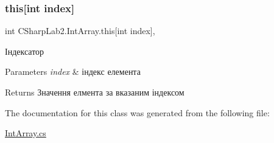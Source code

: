 \subsubsection{\texorpdfstring{this[int index]}{this[int index]}}
{\footnotesize\ttfamily int C\+Sharp\+Lab2.\+Int\+Array.\+this\mbox{[}int index\mbox{]}\hspace{0.3cm}{\ttfamily [get]}, {\ttfamily [set]}}



Індексатор 


\begin{DoxyParams}{Parameters}
{\em index} & індекс елемента\\
\hline
\end{DoxyParams}
\begin{DoxyReturn}{Returns}
Значення елмента за вказаним індексом
\end{DoxyReturn}


The documentation for this class was generated from the following file\+:\begin{DoxyCompactItemize}
\item 
\hyperlink{_int_array_8cs}{Int\+Array.\+cs}\end{DoxyCompactItemize}
